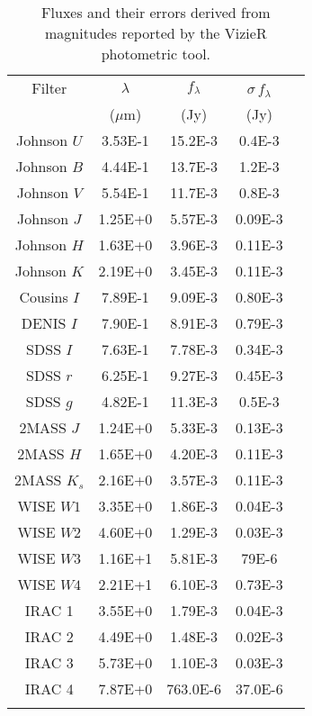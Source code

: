 \documentclass[useAMS,usenatbib]{mn2e}
\begin{document}
\begin{table}\label{Flux}
 \centering
\caption{Fluxes and their errors derived from magnitudes reported by the VizieR photometric tool.}
\begin{tabular}{ccccc}
\hline
Filter                  & $\lambda$    &    $f_\lambda$   &$\sigma$\,$f_\lambda$ \\
                          & ($\mu$m)              &    (Jy)             &        (Jy)         \\\hline    
Johnson $U$         &  3.53E-1    &    15.2E-3             &    0.4E-3            \\                        
Johnson  $B$        &  4.44E-1    &    13.7E-3             &    1.2E-3    \\
Johnson $V$         &        5.54E-1      &    11.7E-3             &    0.8E-3    \\
Johnson $J$        &        1.25E+0      &    5.57E-3             &    0.09E-3    \\
Johnson $H$       &        1.63E+0      &    3.96E-3             &    0.11E-3    \\
Johnson $K$        &        2.19E+0      &    3.45E-3             &    0.11E-3    \\
Cousins $I$           &        7.89E-1      &    9.09E-3             &    0.80E-3    \\
DENIS $I$             & 7.90E-1              &    8.91E-3        &    0.79E-3    \\
SDSS $I$              & 7.63E-1          &    7.78E-3           &    0.34E-3    \\
SDSS $r$             & 6.25E-1          &    9.27E-3           &    0.45E-3    \\
SDSS $g$             & 4.82E-1          &    11.3E-3           &    0.5E-3    \\
2MASS $J$        & 1.24E+0          &    5.33E-3           &    0.13E-3    \\                                    
2MASS $H$        & 1.65E+0         &    4.20E-3           &    0.11E-3    \\
2MASS $K_s$  & 2.16E+0          &    3.57E-3           &    0.11E-3    \\
WISE $W1$  & 3.35E+0          &    1.86E-3           &    0.04E-3    \\
WISE $W2$  & 4.60E+0          &    1.29E-3           &    0.03E-3    \\
WISE $W3$  & 1.16E+1          &    5.81E-3           &    79E-6    \\
WISE $W4$  & 2.21E+1          &    6.10E-3           &    0.73E-3    \\
IRAC 1   & 3.55E+0              &    1.79E-3        &    0.04E-3    \\
IRAC 2  & 4.49E+0          &    1.48E-3        &    0.02E-3    \\
IRAC 3   & 5.73E+0             &    1.10E-3         &    0.03E-3        \\
IRAC 4  & 7.87E+0           &    763.0E-6        &    37.0E-6        \\
\\\hline
\end{tabular}
\end{table}
\end{document}
